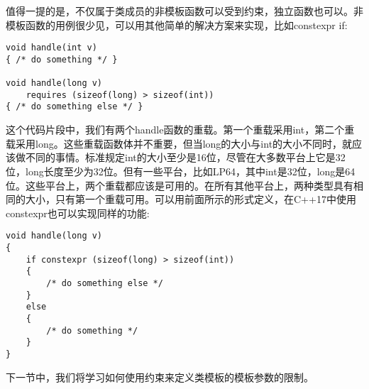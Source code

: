 值得一提的是，不仅属于类成员的非模板函数可以受到约束，独立函数也可以。非模板函数的用例很少见，可以用其他简单的解决方案来实现，比如constexpr if:

\begin{lstlisting}[style=styleCXX]
void handle(int v)
{ /* do something */ }

void handle(long v)
	requires (sizeof(long) > sizeof(int))
{ /* do something else */ }
\end{lstlisting}

这个代码片段中，我们有两个handle函数的重载。第一个重载采用int，第二个重载采用long。这些重载函数体并不重要，但当long的大小与int的大小不同时，就应该做不同的事情。标准规定int的大小至少是16位，尽管在大多数平台上它是32位，long长度至少为32位。但有一些平台，比如LP64，其中int是32位，long是64位。这些平台上，两个重载都应该是可用的。在所有其他平台上，两种类型具有相同的大小，只有第一个重载可用。可以用前面所示的形式定义，在C++17中使用constexpr也可以实现同样的功能:

\begin{lstlisting}[style=styleCXX]
void handle(long v)
{
	if constexpr (sizeof(long) > sizeof(int))
	{
		/* do something else */
	}
	else
	{
		/* do something */
	}
}
\end{lstlisting}

下一节中，我们将学习如何使用约束来定义类模板的模板参数的限制。


